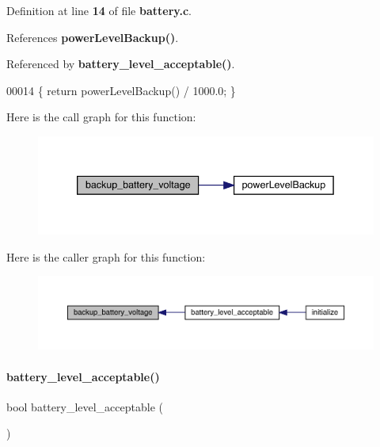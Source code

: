 Definition at line \textbf{ 14} of file \textbf{ battery.\+c}.



References \textbf{ power\+Level\+Backup()}.



Referenced by \textbf{ battery\+\_\+level\+\_\+acceptable()}.


\begin{DoxyCode}
00014 \{ \textcolor{keywordflow}{return} powerLevelBackup() / 1000.0; \}
\end{DoxyCode}
Here is the call graph for this function\+:
\nopagebreak
\begin{figure}[H]
\begin{center}
\leavevmode
\includegraphics[width=339pt]{battery_8c_a9b1c5cf7ddddebf63796050a1d4a9969_cgraph}
\end{center}
\end{figure}
Here is the caller graph for this function\+:
\nopagebreak
\begin{figure}[H]
\begin{center}
\leavevmode
\includegraphics[width=350pt]{battery_8c_a9b1c5cf7ddddebf63796050a1d4a9969_icgraph}
\end{center}
\end{figure}
\mbox{\label{battery_8c_a1097bbb878f6e2690f8eea6cd231959a}} 
\paragraph{battery\+\_\+level\+\_\+acceptable()}
{\footnotesize\ttfamily bool battery\+\_\+level\+\_\+acceptable (\begin{DoxyParamCaption}{ }\end{DoxyParamCaption})}



